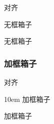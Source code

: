\documentclass{ctexart}
\begin{document}

            对齐
            \begin{minipage}[b][3em][t]{10em}
                无框箱子

                无框箱子
            \end{minipage}

        \subsubsection{加框箱子}


            对齐
            \begin{boxedminipage}[b][3em][t]{10em}
                加框箱子

                加框箱子
            \end{boxedminipage}
\end{document}
